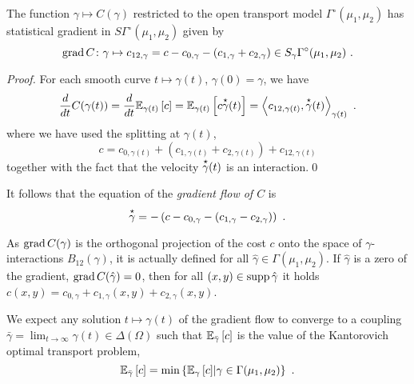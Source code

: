 \documentclass[runningheads]{llncs}
\begin{document}
\begin{proposition}The function $\gamma \mapsto C(\gamma)$ restricted to the open transport model $\Gamma^\circ(\mu_1,\mu_2)$ has statistical gradient in $S\Gamma^\circ(\mu_1,\mu_2)$ given by
%
\begin{equation}\label{eq:gradient}
 \grad C \colon \gamma \mapsto c_{12,\gamma} = c - c_{0,\gamma} - (c_{1,\gamma} + c_{2,\gamma}) \in S_\gamma\Gamma^\circ(\mu_1,\mu_2)  \ . 
\end{equation}
\end{proposition}

\begin{proof}
For each smooth curve $t \mapsto \gamma(t)$, $\gamma(0) = \gamma$, we have 
\begin{equation*}
  \derivby t C(\gamma(t)) = \derivby t \expectat {\gamma(t)} c = \expectat {\gamma(t)} {c \velocity \gamma (t)} = \scalarat {\gamma(t)} {c_{12,\gamma(t)}} {\velocity \gamma(t)} \ .
\end{equation*}
where we have used the splitting at $\gamma(t)$,
\begin{equation*}
  c = c_{0,\gamma(t)} + (c_{1,\gamma(t)} + c_{2,\gamma(t)}) + c_{12,\gamma(t)}
\end{equation*}
together with the fact that the velocity $\overset{\star}{\gamma}(t)$ is an interaction.\qed \end{proof}

It follows that the equation of the \emph{gradient flow of $C$} is
%
\begin{equation*}
  \overset{\star}{\gamma} = - \left(c - c_{0,\gamma} - (c_{1,\gamma} - c_{2,\gamma})\right) \ .
\end{equation*}

\begin{remark}
As $\operatorname{grad} C(\gamma)$ is the orthogonal projection of the cost $c$ onto the space of $\gamma$-interactions $B_{12}(\gamma)$, it is actually defined for all $\hat \gamma \in \Gamma(\mu_1,\mu_2)$. If $\hat \gamma$ is a zero of the gradient,
$\operatorname{grad} C(\hat \gamma) = 0$, then for all $(x,y) \in \operatorname{supp}{\hat \gamma}$ it holds $c(x,y) = c_{0,\gamma} + c_{1,\gamma}(x,y) + c_{2,\gamma}(x,y)$.
\end{remark}

We expect any solution $t \mapsto \gamma(t)$ of the gradient flow to converge to a coupling $\bar\gamma = \lim_{t \to \infty} \gamma(t) \in \Delta(\Omega)$ such that ${\operatorname{\mathbb E}}_{\bar\gamma}\left[c\right]$ is the value of the Kantorovich optimal transport problem,
%
\begin{equation*}
  {\operatorname{\mathbb E}}_{\bar\gamma}\left[c\right] = \min \left\{ {\operatorname{\mathbb E}}_{\gamma}\left[c\right] \middle|  \gamma \in \Gamma(\mu_1,\mu_2) \right\} \ .
\end{equation*}
\end{document}
